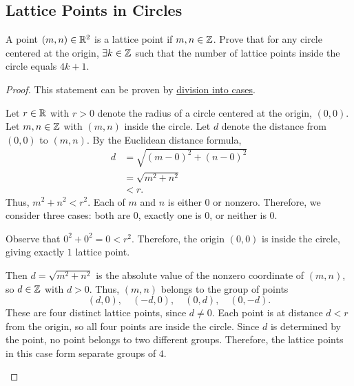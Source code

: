 \subsection{Lattice Points in Circles}
\label{subsections:examples:example3}



\begin{exercise}{
    A point $(m, n) \in \mathbb{R}^2$ is a lattice point if $m, n \in \mathbb{Z}$. %
    Prove that for any circle centered at the origin, %
    $\exists k \in \mathbb{Z}$ such that the number of lattice points inside the %
    circle equals $4k + 1$.
}
\end{exercise}



\begin{proof}{
    This statement can be proven by %
    \hyperref[subsections:techniques:universal:cases]{division into cases}.

    \begin{panel}[Setup.]{
        Let $r \in \mathbb{R}$ with $r > 0$ denote the radius of a circle %
        centered at the origin, $(0, 0)$. %
        Let $m, n \in \mathbb{Z}$ with $(m, n)$ inside the circle. %
        Let $d$ denote the distance from $(0, 0)$ to $(m, n)$. %
        By the Euclidean distance formula, %
        \begin{align*}
            d &= \sqrt{(m - 0)^2 + (n - 0)^2}\\
              &= \sqrt{m^2 + n^2}\\
              &< r.
        \end{align*}
        Thus, $m^2 + n^2 < r^2$. %
        Each of $m$ and $n$ is either $0$ or nonzero. %
        Therefore, we consider three cases: both are $0$, %
        exactly one is $0$, or neither is $0$.
    }
    \end{panel}

    \begin{panel}[Case 1: Suppose $m = 0$ and $n = 0$.]{
        Observe that $0^2 + 0^2 = 0 < r^2$. %
        Therefore, the origin $(0, 0)$ is inside the circle, %
        giving exactly $1$ lattice point.
    }
    \end{panel}

    \begin{panel}{
        Then $d = \sqrt{m^2 + n^2}$ is the absolute value of the nonzero %
        coordinate of $(m, n)$, so $d \in \mathbb{Z}$ with $d > 0$. %
        Thus, $(m, n)$ belongs to the group of points %
        \[
            (d, 0), \quad (-d, 0), \quad (0, d), \quad (0, -d).
        \]
        These are four distinct lattice points, since $d \neq 0$. %
        Each point is at distance $d < r$ from the origin, %
        so all four points are inside the circle. %
        Since $d$ is determined by the point, no point belongs to two %
        different groups. %
        Therefore, the lattice points in this case form separate groups %
        of $4$.
    }
    \end{panel}

}
\end{proof}
